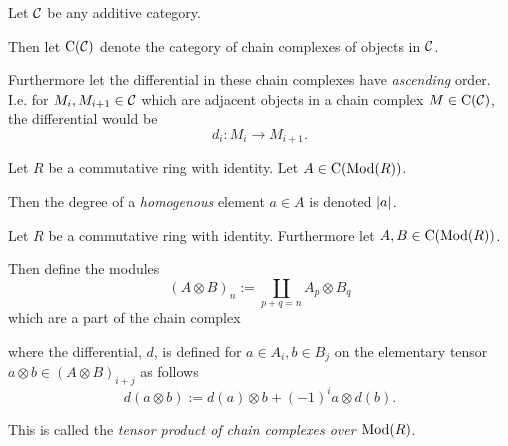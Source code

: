 \begin{notation}
    Let \( {\mathcal{C}} \) be any additive category.
    
    Then let \( \operatorname{C} ({\mathcal{C}}) \) denote the category of chain complexes of objects in \( {\mathcal{C}} \).

    Furthermore let the differential in these chain complexes have \emph{ascending} order. I.e. for \( M_i, M_{i+1} \in {\mathcal{C}} \) which are adjacent objects in a chain complex \( M \in \operatorname{C} ({\mathcal{C}}) \), the differential would be
    \[
        d_i : M_i \to M_{i + 1}.
    \]
\end{notation}

\begin{notation}
    Let \( R \) be a commutative ring with identity. Let \( A \in \operatorname{C} (\operatorname{Mod}(R)) \).

    Then the degree of a \emph{homogenous} element \( a \in A \) is denoted \emph{\( \vert a\vert \)}.
\end{notation}

\begin{definition}
    \label{def:massey_product_in_dg_cat/what_is_a_dg_cat/tensor_product_of_chain_complexes}
    Let \( R \) be a commutative ring with identity. Furthermore let \( A, B \in \operatorname{C} (\operatorname{Mod}(R)) \).

    Then define the modules
    \[
        (A \otimes B)_n := \coprod_{p + q = n} A_p \otimes B_q
    \]
    which are a part of the chain complex
    \begin{center}
    \end{center}
    where the differential, \( d \), is defined for \( a \in A_i, b \in B_j \) on the elementary tensor \( a \otimes b \in (A \otimes B)_{i + j} \) as follows
    \[
        d(a \otimes b) := d(a) \otimes b + (-1)^{i} a \otimes d(b).
    \]

    This is called the \emph{tensor product of chain complexes over \( \operatorname{Mod}(R) \)}.
\end{definition}

